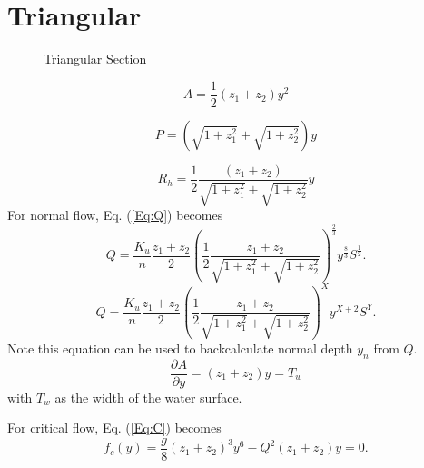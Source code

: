 \section{Triangular}

\begin{figure}[h]
\centering
{}
\caption{Triangular Section}
\end{figure}

\begin{equation}
A = \frac{1}{2} (z_1 + z_2) y^2
\end{equation}

\begin{equation}
P = \left(\sqrt{1+z_1^2} + \sqrt{1+z_2^2}\right)y
\end{equation}

\begin{equation}
R_h = \frac{1}{2}\frac{(z_1 + z_2) }{\sqrt{1+z_1^2} + \sqrt{1+z_2^2}}y
\end{equation}
For normal flow, Eq. (\ref{Eq:Q}) becomes
\begin{equation}
Q = \frac{K_u}{n} \frac{z_1 + z_2}{2}  \left(\frac{1}{2}\frac{z_1 + z_2}{\sqrt{1+z_1^2} + \sqrt{1+z_2^2}}\right)^{\frac{2}{3}} y^{\frac{8}{3}}S^{\frac{1}{2}}.
\label{Eq:TriaNormal}
\end{equation}
\begin{equation}
Q = \frac{K_u}{n} \frac{z_1 + z_2}{2}  \left(\frac{1}{2}\frac{z_1 + z_2}{\sqrt{1+z_1^2} + \sqrt{1+z_2^2}}\right)^X y^{X+2}S^Y.
\end{equation}
Note this equation can be used to backcalculate normal depth $y_n$ from $Q$.
\begin{equation}
\frac{\partial A}{\partial y} = (z_1 + z_2)y = T_w
\end{equation}
with $T_w$ as the width of the water surface.

\noindent For critical flow, Eq. (\ref{Eq:C}) becomes
\begin{equation}  
f_c(y)= \frac{g}{8}(z_1 + z_2)^3y^6 - Q^2(z_1 + z_2)y = 0.
\end{equation}

